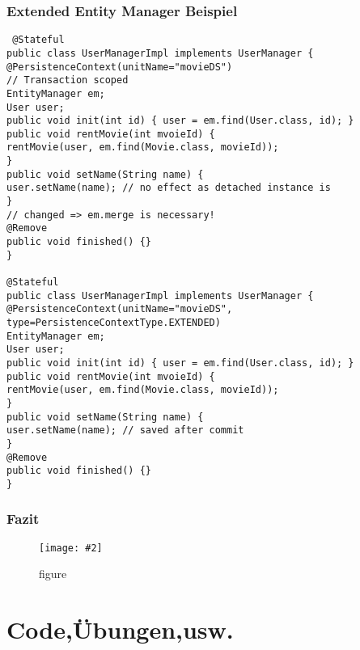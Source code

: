 \documentclass[a4paper,10pt]{scrreprt}
\newcommand{\pic}[2][figure]{\begin{figure}[h]
 \centering
 \texttt{[image: \#2]}
 \caption{#1}
\end{figure}
}
\begin{document}
\section{Extended Entity Manager Beispiel}
\begin{lstlisting}
 @Stateful
public class UserManagerImpl implements UserManager {
@PersistenceContext(unitName="movieDS")
// Transaction scoped
EntityManager em;
User user;
public void init(int id) { user = em.find(User.class, id); }
public void rentMovie(int mvoieId) {
rentMovie(user, em.find(Movie.class, movieId));
}
public void setName(String name) {
user.setName(name); // no effect as detached instance is
}
// changed => em.merge is necessary!
@Remove
public void finished() {}
}

@Stateful
public class UserManagerImpl implements UserManager {
@PersistenceContext(unitName="movieDS",
type=PersistenceContextType.EXTENDED)
EntityManager em;
User user;
public void init(int id) { user = em.find(User.class, id); }
public void rentMovie(int mvoieId) {
rentMovie(user, em.find(Movie.class, movieId));
}
public void setName(String name) {
user.setName(name); // saved after commit
}
@Remove
public void finished() {}
}
\end{lstlisting}

\section{Fazit}
\pic{fz.png}

\part{Code,Übungen,usw.}
\end{document}
